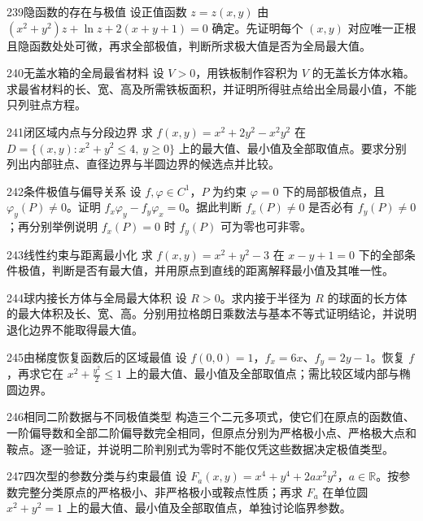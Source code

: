 \begin{exercise}{239}{隐函数的存在与极值}
设正值函数 $z=z(x,y)$ 由 $(x^2+y^2)z+\ln z+2(x+y+1)=0$ 确定。先证明每个 $(x,y)$ 对应唯一正根且隐函数处处可微，再求全部极值，判断所求极大值是否为全局最大值。
\end{exercise}
\begin{exercise}{240}{无盖水箱的全局最省材料}
设 $V>0$，用铁板制作容积为 $V$ 的无盖长方体水箱。求最省材料的长、宽、高及所需铁板面积，并证明所得驻点给出全局最小值，不能只列驻点方程。
\end{exercise}
\begin{exercise}{241}{闭区域内点与分段边界}
求 $f(x,y)=x^2+2y^2-x^2y^2$ 在 $D=\{(x,y):x^2+y^2\le4,\ y\ge0\}$ 上的最大值、最小值及全部取值点。要求分别列出内部驻点、直径边界与半圆边界的候选点并比较。
\end{exercise}
\begin{exercise}{242}{条件极值与偏导关系}
设 $f,\varphi\in C^1$，$P$ 为约束 $\varphi=0$ 下的局部极值点，且 $\varphi_y(P)\ne0$。证明 $f_x\varphi_y-f_y\varphi_x=0$。据此判断 $f_x(P)\ne0$ 是否必有 $f_y(P)\ne0$；再分别举例说明 $f_x(P)=0$ 时 $f_y(P)$ 可为零也可非零。
\end{exercise}
\begin{exercise}{243}{线性约束与距离最小化}
求 $f(x,y)=x^2+y^2-3$ 在 $x-y+1=0$ 下的全部条件极值，判断是否有最大值，并用原点到直线的距离解释最小值及其唯一性。
\end{exercise}
\begin{exercise}{244}{球内接长方体与全局最大体积}
设 $R>0$。求内接于半径为 $R$ 的球面的长方体的最大体积及长、宽、高。分别用拉格朗日乘数法与基本不等式证明结论，并说明退化边界不能取得最大值。
\end{exercise}
\begin{exercise}{245}{由梯度恢复函数后的区域最值}
设 $f(0,0)=1$，$f_x=6x$、$f_y=2y-1$。恢复 $f$，再求它在 $x^2+\frac{y^2}2\le1$ 上的最大值、最小值及全部取值点；需比较区域内部与椭圆边界。
\end{exercise}
\begin{exercise}{246}{相同二阶数据与不同极值类型}
构造三个二元多项式，使它们在原点的函数值、一阶偏导数和全部二阶偏导数完全相同，但原点分别为严格极小点、严格极大点和鞍点。逐一验证，并说明二阶判别式为零时不能仅凭这些数据决定极值类型。
\end{exercise}
\begin{exercise}{247}{四次型的参数分类与约束最值}
设 $F_a(x,y)=x^4+y^4+2ax^2y^2$，$a\in\mathbb R$。按参数完整分类原点的严格极小、非严格极小或鞍点性质；再求 $F_a$ 在单位圆 $x^2+y^2=1$ 上的最大值、最小值及全部取值点，单独讨论临界参数。
\end{exercise}

